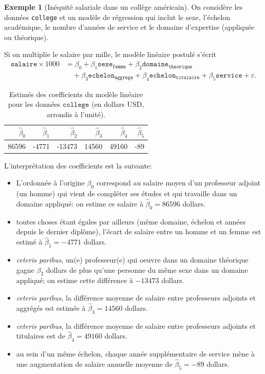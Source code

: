 \documentclass[
  11pt,
  letterpaper,
]{article}
\providecommand{\tightlist}{%
  \setlength{\itemsep}{0pt}\setlength{\parskip}{0pt}}
\theoremstyle{definition}
\theoremstyle{definition}
\newtheorem{example}{Exemple}[section]
\theoremstyle{definition}
\theoremstyle{definition}
\theoremstyle{remark}
\begin{document}
\begin{example}[Inéquité salariale dans un collège américain]
\protect\hypertarget{exm:inequite-salariale}{}\label{exm:inequite-salariale}On considère les données \texttt{college} et un modèle de régression qui inclut le sexe, l'échelon académique, le nombre d'années de service et le domaine d'expertise (appliquée ou théorique).
\end{example}

Si on multiplie le salaire par mille, le modèle linéaire postulé s'écrit
\begin{align*}
\texttt{salaire} \times 1000 &= \beta_0 + \beta_1 \texttt{sexe}_{\texttt{femme}} +\beta_2 \texttt{domaine}_{\texttt{theorique}} \\&\quad +\beta_3 \texttt{echelon}_{\texttt{aggrege}}
+\beta_4 \texttt{echelon}_{\texttt{titulaire}}  +\beta_5 \texttt{service} + \varepsilon.
\end{align*}

\begin{table}

\caption{\label{tab:collegecoefs}Estimés des coefficients du modèle linéaire pour les données $\texttt{college}$ (en dollars USD, arrondis à l'unité).}
\centering
\begin{tabular}[t]{rrrrrr}
\toprule
$\widehat{\beta}_0$ & $\widehat{\beta}_1$ & $\widehat{\beta}_2$ & $\widehat{\beta}_3$ & $\widehat{\beta}_4$ & $\widehat{\beta}_5$\\
\midrule
86596 & -4771 & -13473 & 14560 & 49160 & -89\\
\bottomrule
\end{tabular}
\end{table}

L'interprétation des coefficients est la suivante:

\begin{itemize}
\tightlist
\item
  L'ordonnée à l'origine \(\beta_0\) correspond au salaire moyen d'un professeur adjoint (un homme) qui vient de compléter ses études et qui travaille dans un domaine appliqué: on estime ce salaire à \(\widehat{\beta}_0=86596\) dollars.
\item
  toutes choses étant égales par ailleurs (même domaine, échelon et années depuis le dernier diplôme), l'écart de salaire entre un homme et un femme est estimé à \(\widehat{\beta}_1=-4771\) dollars.
\item
  \emph{ceteris paribus}, un(e) professeur(e) qui oeuvre dans un domaine théorique gagne \(\beta_2\) dollars de plus qu'une personne du même sexe dans un domaine appliqué; on estime cette différence à \(-13473\) dollars.
\item
  \emph{ceteris paribus}, la différence moyenne de salaire entre professeurs adjoints et aggrégés est estimée à \(\widehat{\beta}_3=14560\) dollars.
\item
  \emph{ceteris paribus}, la différence moyenne de salaire entre professeurs adjoints et titulaires est de \(\widehat{\beta}_4=49160\) dollars.
\item
  au sein d'un même échelon, chaque année supplémentaire de service mène à une augmentation de salaire annuelle moyenne de \(\widehat{\beta}_5=-89\) dollars.
\end{itemize}
\end{document}
